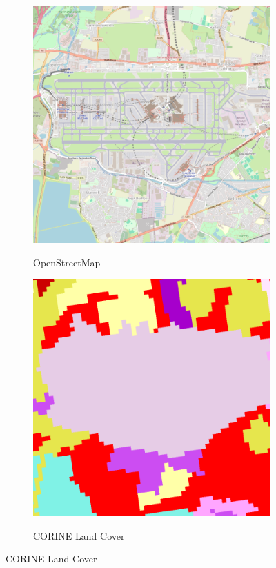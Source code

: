         \begin{figure}[H]
        \centering
        \begin{subfigure}[b]{0.48\textwidth}
            \centering
            \caption{OpenStreetMap}
            \includegraphics[width=\textwidth,height=0.7\textwidth]{figs_06/heathrow_osm.png}
            \label{fig:heathrow_osm}
        \end{subfigure}
        \hfill
        \begin{subfigure}[b]{0.48\textwidth}
            \centering
            \caption{CORINE Land Cover}
            \includegraphics[width=\textwidth,height=0.7\textwidth]{figs_06/heathrow_clc.png}
            \label{fig:heathrow_corine}
        \end{subfigure}
        
        \vspace{0.5em}
        

\end{figure}
